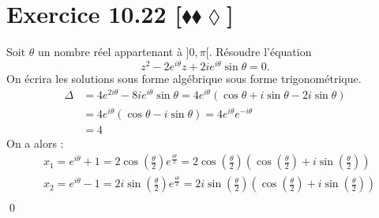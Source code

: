 \documentclass[10pt]{article}
\begin{document}

\section*{Exercice 10.22 [$\blacklozenge\blacklozenge\lozenge$]}
\begin{tcolorbox}[enhanced, width=7in, center, size=fbox, fontupper=\large, drop shadow southwest]
    Soit $\theta$ un nombre réel appartenant à $]0,\pi[$. Résoudre l'équation
    \begin{equation*}
        z^2 - 2e^{i\theta}z + 2ie^{i\theta}\sin\theta=0.
    \end{equation*}
    On écrira les solutions sous forme algébrique  sous forme trigonométrique.
    \begin{align*}
        \Delta&=4e^{2i\theta}-8ie^{i\theta}\sin\theta = 4e^{i\theta}\left(\cos\theta + i\sin\theta - 2i\sin\theta \right) \\
        &= 4e^{i\theta}(\cos\theta-i\sin\theta) = 4e^{i\theta}e^{-i\theta}\\
        &=4
    \end{align*}
    On a alors :
    \begin{align*}
        &x_1 = e^{i\theta} + 1 = 2\cos\left( \frac{\theta}{2} \right)e^{\frac{i\theta}{2}}=2\cos\left( \frac{\theta}{2} \right)\left( \cos\left( \frac{\theta}{2} \right) + i\sin\left( \frac{\theta}{2} \right) \right)\\
        &x_2 = e^{i\theta} - 1 = 2i\sin\left( \frac{\theta}{2} \right)e^{\frac{i\theta}{2}}=2i\sin\left( \frac{\theta}{2} \right)\left( \cos\left( \frac{\theta}{2} \right) + i\sin\left( \frac{\theta}{2} \right) \right)\\
    \end{align*}
    \qed
\end{tcolorbox}
\end{document}
